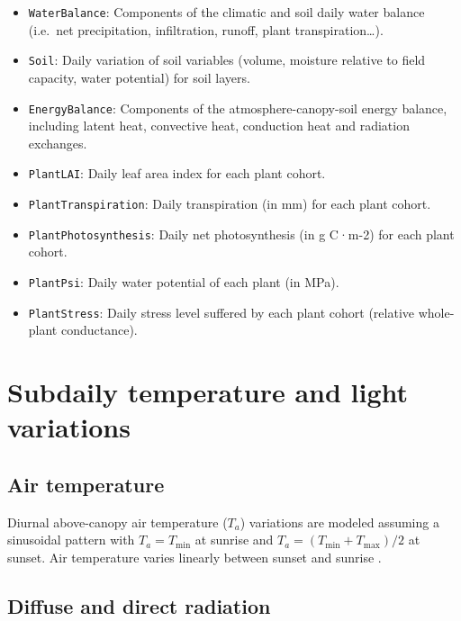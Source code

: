\documentclass[]{book}
\providecommand{\tightlist}{%
  \setlength{\itemsep}{0pt}\setlength{\parskip}{0pt}}
\begin{document}
\begin{itemize}
\tightlist
\item
  \texttt{WaterBalance}: Components of the climatic and soil daily water balance (i.e.~net precipitation, infiltration, runoff, plant transpiration\ldots{}).
\item
  \texttt{Soil}: Daily variation of soil variables (volume, moisture relative to field capacity, water potential) for soil layers.
\item
  \texttt{EnergyBalance}: Components of the atmosphere-canopy-soil energy balance, including latent heat, convective heat, conduction heat and radiation exchanges.
\item
  \texttt{PlantLAI}: Daily leaf area index for each plant cohort.
\item
  \texttt{PlantTranspiration}: Daily transpiration (in mm) for each plant cohort.
\item
  \texttt{PlantPhotosynthesis}: Daily net photosynthesis (in g C·m-2) for each plant cohort.
\item
  \texttt{PlantPsi}: Daily water potential of each plant (in MPa).
\item
  \texttt{PlantStress}: Daily stress level suffered by each plant cohort (relative whole-plant conductance).
\end{itemize}

\hypertarget{subdaily-temperature-and-light-variations}{%
\chapter{Subdaily temperature and light variations}\label{subdaily-temperature-and-light-variations}}

\hypertarget{air-temperature}{%
\section{Air temperature}\label{air-temperature}}

Diurnal above-canopy air temperature (\(T_a\)) variations are modeled assuming a sinusoidal pattern with \(T_a = T_{\min}\) at sunrise and \(T_a = (T_{\min}+T_{\max})/2\) at sunset. Air temperature varies linearly between sunset and sunrise \citep{McMurtrie1990}.

\hypertarget{diffuse-and-direct-radiation}{%
\section{Diffuse and direct radiation}\label{diffuse-and-direct-radiation}}
\end{document}
